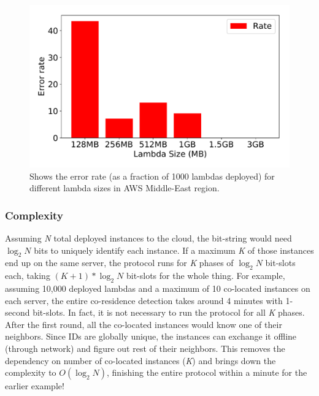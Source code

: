 \begin{figure}[!t]
  \includegraphics[width=.99\linewidth]{fig/errorrates.pdf}
  \caption{Shows the error rate (as a fraction of 1000 lambdas deployed) for different lambda sizes in AWS Middle-East region. 
\label{fig:errorrates}}
\end{figure}

\subsubsection{Complexity}
\label{sec:protocol:complexity}
Assuming \textit{N} total deployed instances to the cloud, the bit-string would need 
$\log_2N$ bits to uniquely identify each instance. If a maximum \textit{K} of those instances 
end up on the same server, the protocol runs for \textit{K} phases of $\log_2N$ bit-slots 
each, taking $(K+1)*\log_2N$ bit-slots for the whole thing. For example, assuming 10,000 deployed lambdas and a maximum of 10 co-located instances on each server, the entire  
co-residence detection takes around 4 minutes with 1-second bit-slots. 
In fact, it is not necessary to run the protocol for all \textit{K} phases. After the 
first round, all the co-located instances would know one of their neighbors. Since IDs are
globally unique, the instances can exchange it offline (through network) and figure out 
rest of their neighbors. This removes the dependency on number of co-located instances 
(\textit{K}) and brings down the complexity to $O(\log_2N)$, finishing the entire protocol 
within a minute for the earlier example!


